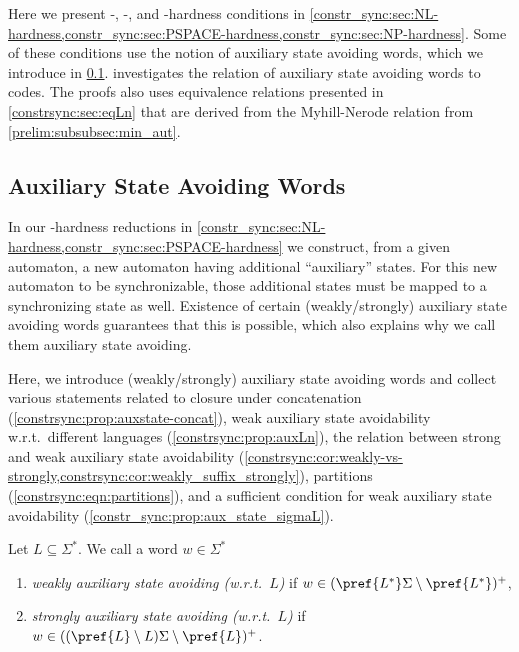 

Here we present \NL-, \PSPACE-, and \NP-hardness conditions in 
\cref{constr_sync:sec:NL-hardness,constr_sync:sec:PSPACE-hardness,constr_sync:sec:NP-hardness}.
Some of these conditions use the notion of auxiliary state avoiding words, which
we introduce in \cref{constrsync:sec:aux}.
 investigates the relation of auxiliary state avoiding
words to codes. The proofs also uses equivalence
relations presented in \cref{constrsync:sec:eqLn} 
that are derived from the Myhill-Nerode relation from \cref{prelim:subsubsec:min_aut}.


\subsection{Auxiliary State Avoiding Words}
\label{constrsync:sec:aux}

In our \PSPACE-hardness reductions in \cref{constr_sync:sec:NL-hardness,constr_sync:sec:PSPACE-hardness}
we construct, from a given automaton, a new automaton
having additional ``auxiliary'' states. For this new automaton
to be synchronizable, those additional states must be mapped to a synchronizing state as well.
Existence of certain (weakly/strongly) auxiliary state avoiding words 
guarantees that this is possible, which also explains why we call them auxiliary state avoiding.

Here, we introduce (weakly/strongly)
auxiliary state avoiding words
and collect various statements
related to closure under concatenation (\cref{constrsync:prop:auxstate-concat}),
weak auxiliary state avoidability w.r.t.~different languages (\cref{constrsync:prop:auxLn}),
the relation between strong and weak auxiliary state avoidability (\cref{constrsync:cor:weakly-vs-strongly,constrsync:cor:weakly_suffix_strongly}), 
partitions (\cref{constrsync:eqn:partitions}),
and a sufficient condition for weak auxiliary state avoidability (\cref{constr_sync:prop:aux_state_sigmaL}).

Let $L \subseteq \Sigma^*$. We call a word $w \in \Sigma^*$
\begin{enumerate}
	\item \emph{weakly auxiliary state avoiding (w.r.t.~$L$)}
	if $w \in (  \pref{L^*}\Sigma  \setminus \pref{L^*} )^+$,
	\item \emph{strongly auxiliary state avoiding (w.r.t.~$L$)}
	if $w \in ( ( \pref{L} \setminus L )\Sigma  \setminus \pref{L} )^+$.
\end{enumerate}

